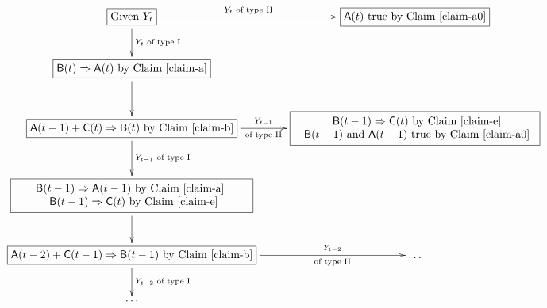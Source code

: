\documentclass{amsart}
\theoremstyle{plain}
\theoremstyle{definition}
\begin{document}
\begin{footnotesize}
\[
    \xymatrix{
      \fbox{Given  $Y_t$} \ar^-{Y_t \textrm{ of type II}}[r] \ar[d]^-{Y_t
        \textrm{ of type I}} &
      \fbox{${\sf{{A}}}(t)$ true by Claim \ref{claim-a0}} \\
      \fbox{${\sf{B}}(t)\Rightarrow{\sf{{A}}}(t)$ by Claim \ref{claim-a}} \ar[d] &  \\
      \fbox{${\sf{{A}}}(t-1)+{\sf{C}}(t)\Rightarrow{\sf{B}}(t)$ by Claim
        \ref{claim-b}} \ar^-{Y_{t-1}}_-{\textrm{of type II}}[r]
      \ar[d]^-{Y_{t-1} \textrm{ of type I}}&
      \fbox{
        \begin{tabular}{c}
          ${\sf{B}}(t-1)\Rightarrow{\sf{C}}(t)$ by Claim \ref{claim-e}\\
          ${\sf{B}}(t-1)$ and ${\sf{{A}}}(t-1)$ true by Claim \ref{claim-a0}
        \end{tabular}}   \\
      \fbox{
        \begin{tabular}{c}
\ \ \           ${\sf{B}}(t-1)\Rightarrow{\sf{{A}}}(t-1)$ by Claim \ref{claim-a}\ \ \ \ \ \ \\
          ${\sf{B}}(t-1)\Rightarrow{\sf{C}}(t)$ by Claim \ref{claim-e}
        \end{tabular}}
      \ar[d] &  \\
      \fbox{${\sf{{A}}}(t-2)+{\sf{C}}(t-1)\Rightarrow{\sf{B}}(t-1)$ by Claim
        \ref{claim-b}} \ar^-{Y_{t-2}}_-{\textrm{of type II}}[r]
      \ar[d]^-{Y_{t-2} \textrm{ of type I}}&
      {\ldots}\\
      \ldots &
}
\]
\end{footnotesize}
\end{document}
